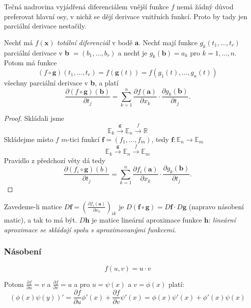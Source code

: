 \documentclass[../main.tex]{subfiles}
\begin{document}
\begin{intuition}
	Tečná nadrovina vyjádřená diferenciálem vnější funkce $f$ nemá žádný důvod preferovat hlavní osy, v nichž se 
	dějí derivace vnitřních funkcí. Proto by tady jen parciální derivace nestačily.
\end{intuition}

\begin{theorem}
	Nechť má $f(\textbf{x})$ \textit{totální diferenciál} v bodě \textbf{a}. Nechť mají funkce $g_k(t_1,...,t_r)$ parciální 
	derivace v \textbf{b} $= (b_1,...,b_r)$ a nechť je $g_k(\textbf{b}) = a_k$ pro $k = 1,...,n.$ Potom má funkce
	\[(f\circ \textbf{g})(t_1,...,t_r) = f(\textbf{g}(t)) = f(g_1(t),...,g_n(t))\]
	všechny parciální derivace v \textbf{b}, a platí 
	\[\frac{\partial (f \circ \textbf{g})(\textbf{b})}{\partial t_j} = \sum^n_{k=1}\frac{\partial f(\textbf{a})}{\partial x_k}
	\cdot \frac{\partial g_k(\textbf{b})}{\partial t_j}.\]
\end{theorem}

\begin{proof}
	Skládali jsme
	\[\mathbb{E}_k \xrightarrow{\mathbf{g}} \mathbb{E}_n \xrightarrow{\textit{f}} \mathbb{R} \]
	Skládejme místo $f$ $m$-tici funkcí
	$\mathbf{f} = (f_1,...,f_m)$, tedy $\mathbf{f}: \mathbb{E}_n \rightarrow \mathbb{E}_m$
	\[\mathbb{E}_k \xrightarrow{\mathbf{g}} \mathbb{E}_n \xrightarrow{\textit{f}} \mathbb{E}_m \]
	Pravidlo z předchozí věty dá tedy
	\[\frac{\partial (f_i \circ \mathbf{g})(b)}{\partial t_j} = \sum^n_{k=1} \frac{\partial f_i(\mathbf{a})}{\partial x_k}
	\cdot \frac{\partial g_k(\mathbf{b})}{\partial t_j}.\]
\end{proof}

\begin{remark}
	Zavedeme-li matice $D\mathbf{f} = \left(\frac{\partial f_i(\mathbf{a})}{\partial x_k}\right)_{ik}$ je 
	$D(\mathbf{f}\circ \mathbf{g}) = D\mathbf{f}\cdot D\mathbf{g}$ (napravo násobení matic), a tak to má být. $D\mathbf{h}$ je matice lineární aproximace 
	funkce $\mathbf{h}$: \textit{lineární aproximace se skládají spolu s aproximovanými funkcemi}.
\end{remark}

\subsubsection{Násobení}
\[ f(u,v) = u \cdot v \]

Potom $ \frac{\partial f}{\partial u} = v $ a $ \frac{\partial f}{\partial v} = u $
a pro $u = \psi (x)$ a $ v = \phi (x) $ platí:
\[ (\phi (x) \psi (y))' =
\frac{\partial f}{\partial u} \phi '(x) + \frac{\partial f}{\partial v} \psi '(x) = 
\phi (x)\psi '(x) + \phi '(x)\psi (x)  \]
\end{document}
